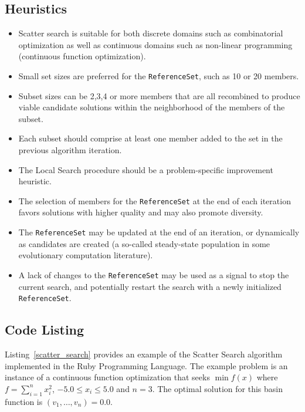 \subsection{Heuristics}
\begin{itemize}
	\item Scatter search is suitable for both discrete domains such as combinatorial optimization as well as continuous domains such as non-linear programming (continuous function optimization).
	\item Small set sizes are preferred for the \texttt{ReferenceSet}, such as 10 or 20 members.
	\item Subset sizes can be 2,3,4 or more members that are all recombined to produce viable candidate solutions within the neighborhood of the members of the subset.
	\item Each subset should comprise at least one member added to the set in the previous algorithm iteration.
	\item The Local Search procedure should be a problem-specific improvement heuristic. 
	\item The selection of members for the \texttt{ReferenceSet} at the end of each iteration favors solutions with higher quality and may also promote diversity.
	\item The \texttt{ReferenceSet} may be updated at the end of an iteration, or dynamically as candidates are created (a so-called steady-state population in some evolutionary computation literature).
	\item A lack of changes to the \texttt{ReferenceSet} may be used as a signal to stop the current search, and potentially restart the search with a newly initialized \texttt{ReferenceSet}.	
\end{itemize}

\subsection{Code Listing}
Listing~\ref{scatter_search} provides an example of the Scatter Search algorithm implemented in the Ruby Programming Language. 
The example problem is an instance of a continuous function optimization that seeks $\min f(x)$ where $f=\sum_{i=1}^n x_{i}^2$, $-5.0\leq x_i \leq 5.0$ and $n=3$. The optimal solution for this basin function is $(v_1,\ldots,v_{n})=0.0$.

